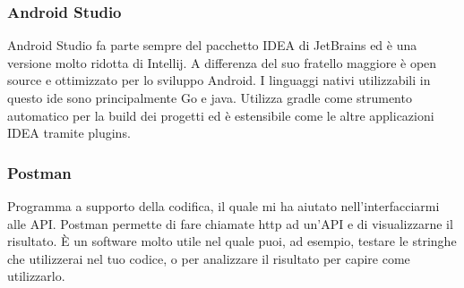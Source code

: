 \subsubsection{Android Studio}
Android Studio fa parte sempre del pacchetto IDEA di JetBrains ed è una versione molto ridotta di Intellij. A differenza del suo
fratello maggiore è open source e ottimizzato per lo sviluppo Android. I linguaggi nativi utilizzabili in questo \acrshort{ide} sono principalmente
\gls{Go} e \gls{java}. Utilizza gradle come strumento automatico per la build dei progetti ed è estensibile come le altre applicazioni IDEA
tramite plugins.

\subsubsection{Postman}
Programma a supporto della codifica, il quale mi ha aiutato nell'interfacciarmi alle API. Postman permette di fare chiamate \acrshort{http} ad
un'API e di visualizzarne il risultato. È un software molto utile nel quale puoi, ad esempio, testare le stringhe che utilizzerai nel tuo
codice, o per analizzare il risultato per capire come utilizzarlo.
